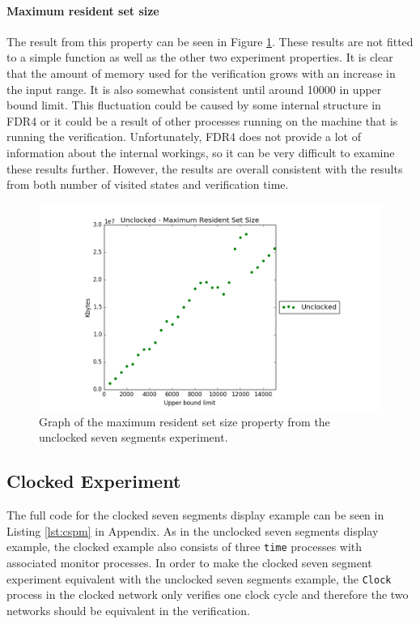 \paragraph{Maximum resident set size}
The result from this property can be seen in Figure \ref{fig:unclocked_resident_size}. These results are not fitted to a simple function as well as the other two experiment properties. It is clear that the amount of memory used for the verification grows with an increase in the input range. It is also somewhat consistent until around 10000 in upper bound limit. This fluctuation could be caused by some internal structure in FDR4 or it could be a result of other processes running on the machine that is running the verification. Unfortunately, FDR4 does not provide a lot of information about the internal workings, so it can be very difficult to examine these results further. However, the results are overall consistent with the results from both number of visited states and verification time.
\begin{figure}
    \centering
    \includegraphics[scale=0.6]{./figures/plots/unclocked_size.png}
\caption{Graph of the maximum resident set size property from the unclocked seven segments experiment.}
\label{fig:unclocked_resident_size}
\end{figure}

\subsection{Clocked Experiment}
The full code for the clocked seven segments display example can be seen in Listing \ref{lst:cspm} in Appendix. %
As in the unclocked seven segments display example, the clocked example also consists of three \texttt{time} processes with associated monitor processes.
In order to make the clocked seven segment experiment equivalent with the unclocked seven segments example, the \texttt{Clock} process in the clocked network only verifies one clock cycle and therefore the two networks should be equivalent in the verification.
